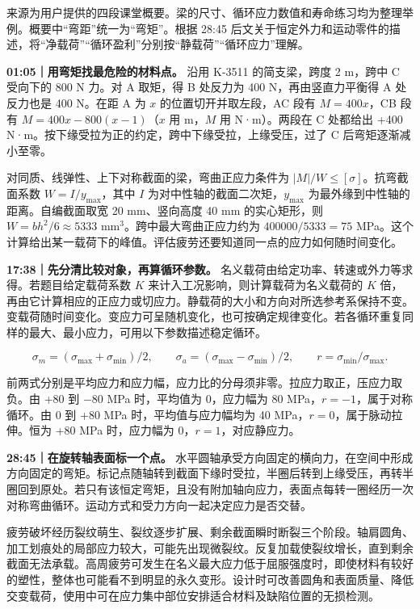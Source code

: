 \documentclass[zihao=5,a4paper,UTF8,fontset=fandol]{ctexart}
\begin{document}
来源为用户提供的四段课堂概要。梁的尺寸、循环应力数值和寿命练习均为整理举例。概要中“弯距”统一为“弯矩”。根据 28:45 后文关于恒定外力和运动零件的描述，将“净载荷”“循环盈利”分别按“静载荷”“循环应力”理解。


\textbf{01:05｜用弯矩找最危险的材料点。} 沿用 K-3511 的简支梁，跨度 2 m，跨中 C 受向下的 800 N 力。对 A 取矩，得 B 处反力为 400 N，再由竖直力平衡得 A 处反力也是 400 N。在距 A 为 $x$ 的位置切开并取左段，AC 段有 $M=400x$，CB 段有 $M=400x-800(x-1)$（$x$ 用 m，$M$ 用 N·m）。两段在 C 处都给出 +400 N·m。按下缘受拉为正的约定，跨中下缘受拉，上缘受压，过了 C 后弯矩逐渐减小至零。


对同质、线弹性、上下对称截面的梁，弯曲正应力条件为 $|M|/W\leq[\sigma]$。抗弯截面系数 $W=I/y_{\max}$，其中 $I$ 为对中性轴的截面二次矩，$y_{\max}$ 为最外缘到中性轴的距离。自编截面取宽 20 mm、竖向高度 40 mm 的实心矩形，则 $W=bh^2/6\approx5333$ mm$^{3}$。跨中最大弯曲正应力约为 $400000/5333=75$ MPa。这个计算给出某一载荷下的峰值。评估疲劳还要知道同一点的应力如何随时间变化。


\textbf{17:38｜先分清比较对象，再算循环参数。} 名义载荷由给定功率、转速或外力等求得。若题目给定载荷系数 $K$ 来计入工况影响，则计算载荷为名义载荷的 $K$ 倍，再由它计算相应的正应力或切应力。静载荷的大小和方向对所选参考系保持不变。变载荷随时间变化。变应力可呈随机变化，也可按确定规律变化。若各循环重复同样的最大、最小应力，可用以下参数描述稳定循环。


\[\sigma_m=(\sigma_{\max}+\sigma_{\min})/2,\qquad \sigma_a=(\sigma_{\max}-\sigma_{\min})/2,\qquad r=\sigma_{\min}/\sigma_{\max}.\]


前两式分别是平均应力和应力幅，应力比的分母须非零。拉应力取正，压应力取负。由 +80 到 $-$80 MPa 时，平均值为 0，应力幅为 80 MPa，$r=-1$，属于对称循环。由 0 到 +80 MPa 时，平均值与应力幅均为 40 MPa，$r=0$，属于脉动拉伸。恒为 +80 MPa 时，应力幅为 0，$r=1$，对应静应力。


\textbf{28:45｜在旋转轴表面标一个点。} 水平圆轴承受方向固定的横向力，在空间中形成方向固定的弯矩。标记点随轴转到截面下缘时受拉，半圈后转到上缘受压，再转半圈回到原处。若只有该恒定弯矩，且没有附加轴向应力，表面点每转一圈经历一次对称弯曲循环。运动方式和受力方向一起决定应力是否交替。


疲劳破坏经历裂纹萌生、裂纹逐步扩展、剩余截面瞬时断裂三个阶段。轴肩圆角、加工划痕处的局部应力较大，可能先出现微裂纹。反复加载使裂纹增长，直到剩余截面无法承载。高周疲劳可发生在名义最大应力低于屈服强度时，即使材料有较好的塑性，整体也可能看不到明显的永久变形。设计时可改善圆角和表面质量、降低交变载荷，使用中可在应力集中部位安排适合材料及缺陷位置的无损检测。
\end{document}
